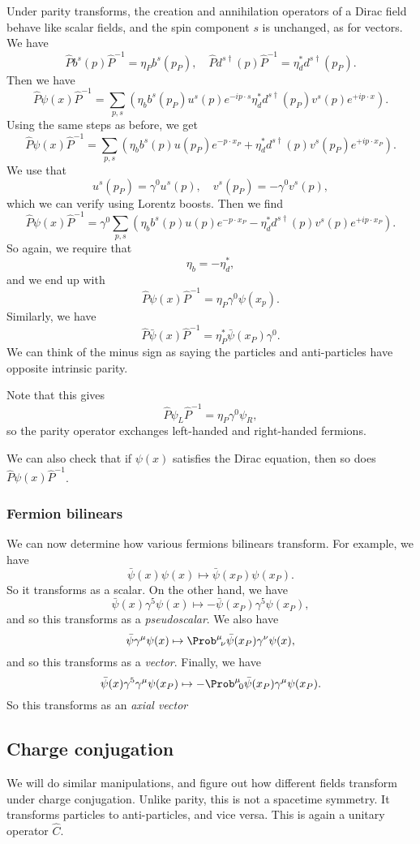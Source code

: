\documentclass[a4paper]{article}
\begin{document}
Under parity transforms, the creation and annihilation operators of a Dirac field behave like scalar fields, and the spin component $s$ is unchanged, as for vectors. We have
\[
  \hat{P} b^s(p) \hat{P}^{-1} = \eta_P b^s(p_P),\quad \hat{P} d^{s\dagger}(p) \hat{P}^{-1} = \eta_d^* d^{s\dagger}(p_P).
\]
Then we have
\[
  \hat{P} \psi(x) \hat{P}^{-1} = \sum_{p, s} \left(\eta_b b^s(p_P) u^s(p) e^{-ip\cdot s} \eta_d^* d^{s\dagger} (p_P) v^s(p) e^{+ip\cdot x}\right).
\]
Using the same steps as before, we get
\[
  \hat{P}\psi(x) \hat{P}^{-1} = \sum_{p, s}\left( \eta_b b^s(p) u(p_P) e^{-p\cdot x_P} + \eta_d^* d^{s\dagger}(p) v^s(p_P) e^{+ip\cdot x_P}\right).
\]
We use that
\[
  u^s(p_P) = \gamma^0 u^s(p),\quad v^s(p_P) = - \gamma^0 v^s(p),
\]
which we can verify using Lorentz boosts. Then we find
\[
  \hat{P} \psi(x) \hat{P}^{-1} = \gamma^0 \sum_{p, s}\left( \eta_b b^s(p) u(p) e^{-p\cdot x_P} - \eta_d^* d^{s\dagger}(p) v^s(p) e^{+ip\cdot x_P}\right).
\]
So again, we require that
\[
  \eta_b = - \eta_d^*,
\]
and we end up with
\[
  \hat{P} \psi(x) \hat{P}^{-1} = \eta_P \gamma^0 \psi(x_p).
\]
Similarly, we have
\[
  \hat{P} \bar\psi(x) \hat{P}^{-1} = \eta_P^* \bar\psi(x_P) \gamma^0.
\]
We can think of the minus sign as saying the particles and anti-particles have opposite intrinsic parity.

Note that this gives
\[
  \hat{P} \psi_L \hat{P}^{-1} = \eta_P \gamma^0 \psi_R,
\]
so the parity operator exchanges left-handed and right-handed fermions.

We can also check that if $\psi(x)$ satisfies the Dirac equation, then so does $\hat{P} \psi(x) \hat{P}^{-1}$.

\subsubsection*{Fermion bilinears}
We can now determine how various fermions bilinears transform. For example, we have
\[
  \bar\psi(x) \psi(x) \mapsto \bar\psi(x_P) \psi(x_P).
\]
So it transforms as a scalar. On the other hand, we have
\[
  \bar\psi(x) \gamma^5 \psi(x) \mapsto - \bar{\psi}(x_P) \gamma^5 \psi(x_P),
\]
and so this transforms as a \emph{pseudoscalar}. We also have
\[
  \bar\psi \gamma^\mu \psi(x) \mapsto \Prob^\mu\!_\nu \bar\psi(x_P) \gamma^\nu \psi(x),
\]
and so this transforms as a \emph{vector}. Finally, we have
\[
  \bar\psi(x) \gamma^5 \gamma^\mu \psi(x_P) \mapsto - \Prob^\mu\!_0 \bar\psi(x_P) \gamma^\mu \psi(x_P).
\]
So this transforms as an \emph{axial vector}
\subsection{Charge conjugation}
We will do similar manipulations, and figure out how different fields transform under charge conjugation. Unlike parity, this is not a spacetime symmetry. It transforms particles to anti-particles, and vice versa. This is again a unitary operator $\hat{C}$.
\end{document}
